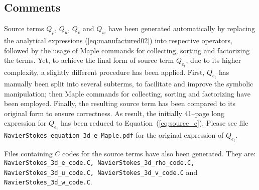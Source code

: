 \documentclass[10pt]{article}
\begin{document}
\begin{landscape}
\section{Comments}

Source terms $Q_{\rho}$, $Q_u$, $Q_v$ and $Q_w$ have been generated automatically by replacing the analytical expressions (\ref{eq:manufactured02}) into  respective operators, followed by the usage of Maple commands for collecting, sorting and factorizing the terms. Yet,  to achieve the final form of source term $Q_{e_t}$, due to its higher complexity, a slightly different procedure has been applied.  First, $Q_{e_t}$ has manually been split into several subterms, to facilitate and improve the symbolic manipulation; then Maple commands for collecting, sorting and factorizing have been employed. Finally, the resulting source term has been compared to its original form to ensure correctness. As  result, the initially 41--page long expression for $Q_{e_t}$ has been  reduced to Equation~(\ref{eq:source_e}). Please see file {\tt NavierStokes\_equation\_3d\_e\_Maple.pdf} for the original expression of $Q_{e_t}$.

Files containing  $C$ codes for the source terms have also been generated. They are: \texttt{NavierStokes\_3d\_e\_code.C, NavierStokes\_3d\_rho\_code.C, NavierStokes\_3d\_u\_code.C, NavierStokes\_3d\_v\_code.C} and \texttt{NavierStokes\_3d\_w\_code.C}.


\end{landscape}
\end{document}
